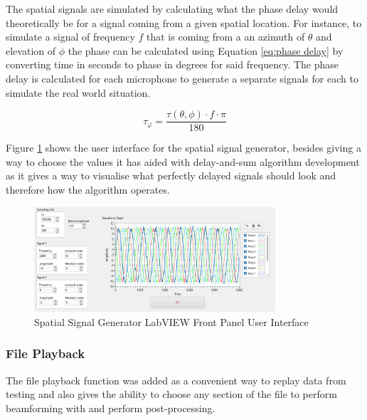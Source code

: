 \documentclass{UoNMCHA}
\numberwithin{equation}{section}
\begin{document}
    The spatial signals are simulated by calculating what the phase delay would theoretically be for a signal coming from a given spatial location. For instance, to simulate a signal of frequency $f$ that is coming from a an azimuth of $\theta$ and elevation of $\phi$ the phase can be calculated using Equation \ref{eq:phase delay} by converting time in seconds to phase in degrees for said frequency. The phase delay is calculated for each microphone to generate a separate signals for each to simulate the real world situation.
    
    \begin{equation}
        \tau_{\varphi} = \frac{\tau(\theta,\phi) \cdot f \cdot \pi}{180}
        \label{eq:phase delay}
    \end{equation}
    
    Figure \ref{fig:SignalGenPanel} shows the user interface for the spatial signal generator, besides giving a way to choose the values it has aided with delay-and-sum algorithm development as it gives a way to visualise what perfectly delayed signals should look and therefore how the algorithm operates.
    
    \begin{figure}[H]
        \centering
        \includegraphics[keepaspectratio, width = 0.8\textwidth]{Figures/SignalGenPanel_5ULA50mm.png}
        \caption{Spatial Signal Generator LabVIEW Front Panel User Interface}
        \label{fig:SignalGenPanel}
    \end{figure}    

\subsubsection{File Playback} \label{sec:File Playback}

The file playback function was added as a convenient way to replay data from testing and also gives the ability to choose any section of the file to perform beamforming with and perform post-processing.
\end{document}
